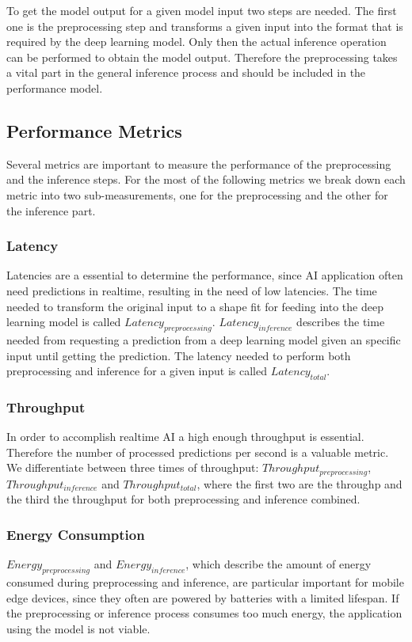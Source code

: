To get the model output for a given model input two steps are needed. The first one is the preprocessing step and transforms a given input into the format that is required by the deep learning model. Only then the actual inference operation can be performed to obtain the model output. Therefore the preprocessing takes a vital part in the general inference process and should be included in the performance model.

\subsection{Performance Metrics}
Several metrics are important to measure the performance of the preprocessing and the inference steps. For the most of the following metrics we break down each metric into two sub-measurements, one for the preprocessing  and the other for the inference part.

\subsubsection{Latency}
Latencies are a essential to determine the performance, since AI application often need predictions in realtime, resulting in the need of low latencies.
The time needed to transform the original input to a shape fit for feeding into the deep learning model is called $Latency_{preprocessing}$.
$Latency_{inference}$ describes the time needed from requesting a prediction from a deep learning model given an specific input until getting the prediction.
The latency needed to perform both preprocessing and inference for a given input is called $Latency_{total}$.
\subsubsection{Throughput}
In order to accomplish realtime AI a high enough throughput is essential. Therefore the number of processed predictions per second is a valuable metric. We differentiate between three times of throughput: $Throughput_{preprocessing}$, $Throughput_{inference}$ and $Throughput_{total}$, where the first two are the throughp and the third the throughput for both preprocessing and inference combined.



\subsubsection{Energy Consumption}
$Energy_{preprocessing}$ and $Energy_{inference}$, which describe the amount of energy consumed during preprocessing and inference, are particular important for mobile edge devices, since they often are powered by batteries with a limited lifespan. If the preprocessing or inference process consumes too much energy, the application using the model is not viable.


